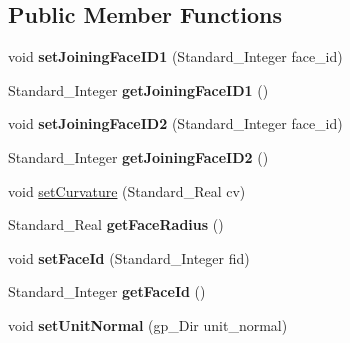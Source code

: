 \subsection*{Public Member Functions}
\begin{DoxyCompactItemize}
\item 
\hypertarget{classModelFace_a63cefab86b4dfec7caac9a9d8abc0c07}{void {\bfseries set\-Joining\-Face\-I\-D1} (Standard\-\_\-\-Integer face\-\_\-id)}\label{classModelFace_a63cefab86b4dfec7caac9a9d8abc0c07}

\item 
\hypertarget{classModelFace_a6e3135935eac6d20013e9a7f6b5d7492}{Standard\-\_\-\-Integer {\bfseries get\-Joining\-Face\-I\-D1} ()}\label{classModelFace_a6e3135935eac6d20013e9a7f6b5d7492}

\item 
\hypertarget{classModelFace_a55c2af23e5b4fef4532996560b71f76f}{void {\bfseries set\-Joining\-Face\-I\-D2} (Standard\-\_\-\-Integer face\-\_\-id)}\label{classModelFace_a55c2af23e5b4fef4532996560b71f76f}

\item 
\hypertarget{classModelFace_a0266a6e805ace7ea414da2a4c1e13975}{Standard\-\_\-\-Integer {\bfseries get\-Joining\-Face\-I\-D2} ()}\label{classModelFace_a0266a6e805ace7ea414da2a4c1e13975}

\item 
void \hyperlink{classModelFace_acbf209155f59f95036935dd082281aa8}{set\-Curvature} (Standard\-\_\-\-Real cv)
\item 
\hypertarget{classModelFace_aaf6871e0fdb9b9cd07745cb39b5b816b}{Standard\-\_\-\-Real {\bfseries get\-Face\-Radius} ()}\label{classModelFace_aaf6871e0fdb9b9cd07745cb39b5b816b}

\item 
\hypertarget{classModelFace_a0984a9f0ded1a02949c4b7bc93348f14}{void {\bfseries set\-Face\-Id} (Standard\-\_\-\-Integer fid)}\label{classModelFace_a0984a9f0ded1a02949c4b7bc93348f14}

\item 
\hypertarget{classModelFace_afd47dfaca9c38b5e788edcfc705fcc43}{Standard\-\_\-\-Integer {\bfseries get\-Face\-Id} ()}\label{classModelFace_afd47dfaca9c38b5e788edcfc705fcc43}

\item 
\hypertarget{classModelFace_ae28293e19bdb459edbf4322ac2d3cf70}{void {\bfseries set\-Unit\-Normal} (gp\-\_\-\-Dir unit\-\_\-normal)}\label{classModelFace_ae28293e19bdb459edbf4322ac2d3cf70}


\end{DoxyCompactItemize}
